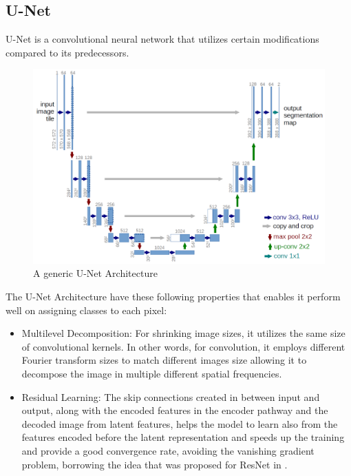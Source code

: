 \documentclass{IEEEtran}
\begin{document}
\subsection{U-Net}
U-Net is a convolutional neural network that utilizes certain modifications compared to its predecessors. 

\begin{figure}[h]
\centering
\includegraphics[width=\textwidth]{img/u-net-architecture.png}
\caption{A generic U-Net Architecture}\label{fig:unet}
\end{figure}

\vfill\null\newpage
The U-Net Architecture have these following properties that enables it perform well on assigning classes to each pixel: 

\begin{itemize}
    \item Multilevel Decomposition: For shrinking image sizes,  it utilizes the same size of convolutional kernels. In other words, for convolution, it employs different Fourier transform sizes to match different images size allowing it to decompose the image in multiple different spatial frequencies. 
    \item Residual Learning: The skip connections created in between input and output, along with the encoded features in the encoder pathway and the decoded image from latent features, helps the model to learn also from the features encoded before the latent representation and speeds up the training and provide a good convergence rate, avoiding the vanishing gradient problem, borrowing the idea that was proposed for ResNet in \cite{he2016deep}. 
\end{itemize}
\end{document}
